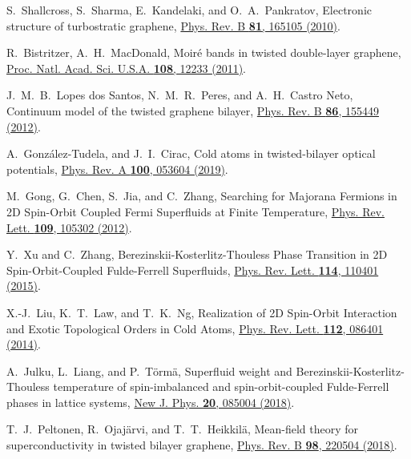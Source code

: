 \documentclass[twocolumn,english,prl,floatfix,citeautoscript,nofootinbib]{revtex4}
\begin{document}
\begin{widetext}
\begin{thebibliography}{99}
 S.~Shallcross, S.~Sharma, E.~Kandelaki, and
O.~A.~Pankratov, Electronic structure of turbostratic graphene, \href{https://doi.org/10.1103/PhysRevB.81.165105}%
{Phys. Rev. B \textbf{81}, 165105 (2010)}.

 R.~Bistritzer, A.~H.~MacDonald, Moir\'e bands in
twisted double-layer graphene, \href{https://doi.org/10.1073/pnas.1108174108}%
{Proc. Natl. Acad. Sci. U.S.A. \textbf{108}, 12233 (2011)}.

 J.~M.~B.~Lopes dos Santos, N.~M.~R.~Peres, and
A.~H.~Castro Neto, Continuum model of the twisted graphene bilayer, \href{https://doi.org/10.1103/PhysRevB.86.155449}%
{Phys. Rev. B \textbf{86}, 155449 (2012)}.

 A.~Gonz\'alez-Tudela, and J.~I.~Cirac, Cold
atoms in twisted-bilayer optical potentials, \href{https://doi.org/10.1103/PhysRevA.100.053604}%
{Phys. Rev. A \textbf{100}, 053604 (2019)}.

 M.~Gong, G.~Chen, S.~Jia, and C.~Zhang,
Searching for Majorana Fermions in 2D Spin-Orbit Coupled Fermi Superfluids
at Finite Temperature, \href{https://doi.org/10.1103/PhysRevLett.109.105302}{%
Phys. Rev. Lett. \textbf{109}, 105302 (2012)}.

 Y.~Xu and C.~Zhang,
Berezinskii-Kosterlitz-Thouless Phase Transition in 2D Spin-Orbit-Coupled
Fulde-Ferrell Superfluids, \href{https://doi.org/10.1103/PhysRevLett.114.110401}%
{Phys. Rev. Lett. \textbf{114}, 110401 (2015)}.

 X.-J.~Liu, K.~T.~Law, and T.~K.~Ng,
Realization of 2D Spin-Orbit Interaction and Exotic Topological Orders in
Cold Atoms, \href{https://doi.org/10.1103/PhysRevLett.112.086401}{Phys. Rev.
Lett. \textbf{112}, 086401 (2014)}.

 A.~Julku, L.~Liang, and P.~T{\"o}rm{\"a},
Superfluid weight and Berezinskii-Kosterlitz-Thouless
temperature of spin-imbalanced and spin-orbit-coupled
Fulde-Ferrell phases in lattice systems, \href{https://doi.org/10.1088/1367-2630/aad891}%
{New J. Phys. \textbf{20}, 085004 (2018)}.

 T.~J.~Peltonen, R.~Ojaj\"arvi, and
T.~T.~Heikkil\"a, Mean-field theory for superconductivity in twisted bilayer
graphene, \href{https://doi.org/10.1103/PhysRevB.98.220504}{Phys. Rev. B
\textbf{98}, 220504 (2018)}.


\end{thebibliography}
\end{widetext}
\end{document}
